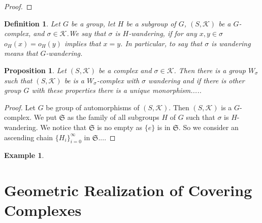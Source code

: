 \documentclass{amsart}
\newtheorem{proposition}{Proposition}[section]
\newtheorem{definition}{Definition}[section]
\newtheorem{example}{Example}[section]
\begin{document}
\begin{proof}

\end{proof}


\begin{definition}
Let $G$ be a group, let $H$ be a subgroup of $G$, $(S,\mathcal{K})$ be a $G$-complex, and $\sigma\in\mathcal{K}$.We say that $\sigma$ is $H$-wandering, if for any $x,y\in\sigma$ $o_H(x)=o_H(y)$ implies that $x=y$. In particular, to say that $\sigma$ is wandering means that $G$-wandering.
\end{definition}

\begin{proposition}
Let $(S,\mathcal{K})$ be a complex and $\sigma\in\mathcal{K}$. Then there is a group $W_\sigma$ such that  $(S,\mathcal{K})$ be is a $W_\sigma$-complex with $\sigma$ wandering and if there is other group $G$ with these properties there is a unique monorphism.....
\end{proposition}


\begin{proof}
Let $G$ be group of automorphisms of $(S,\mathcal{K})$. Then $(S,\mathcal{K})$ is a $G$-complex.  We put $\mathfrak{S}$ as the family of all subgroups $H$ of $G$ such that $\sigma$ is $H$-wandering. We notice that $\mathfrak{S}$ is no empty as $\{e\}$ is in $\mathfrak{S}$. So we consider an ascending chain $\{H_i\}_{i=0}^\infty$ in $\mathfrak{S}$....
\end{proof}











\begin{example}

\end{example}















\section{Geometric Realization of Covering Complexes}
\end{document}
